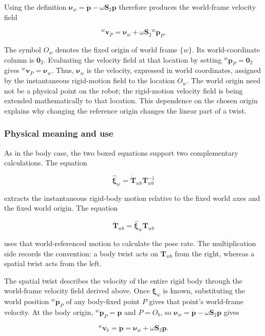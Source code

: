 \documentclass[
  australian,
  12pt,
  letterpaper,
  DIV=11,
  numbers=noendperiod,
  twoside]{scrreprt}
\begin{document}
Using the definition
\(\boldsymbol\nu_w=\dot{\mathbf p}-\omega\mathbf S_2\mathbf p\)
therefore produces the world-frame velocity field

\[
\boxed{
{}^w\mathbf v_P
=
\boldsymbol\nu_w
+
\omega\mathbf S_2{}^w\mathbf p_P
}.
\]

The symbol \(O_w\) denotes the fixed origin of world frame \(\{w\}\).
Its world-coordinate column is \(\mathbf 0_2\). Evaluating the velocity
field at that location by setting \({}^w\mathbf p_P=\mathbf 0_2\) gives
\({}^w\mathbf v_P=\boldsymbol\nu_w\). Thus, \(\boldsymbol\nu_w\) is the
velocity, expressed in world coordinates, assigned by the instantaneous
rigid-motion field to the location \(O_w\). The world origin need not be
a physical point on the robot; the rigid-motion velocity field is being
extended mathematically to that location. This dependence on the chosen
origin explains why changing the reference origin changes the linear
part of a twist.

\subsubsection{Physical meaning and
use}\label{physical-meaning-and-use-1}

As in the body case, the two boxed equations support two complementary
calculations. The equation

\[
\widehat{\boldsymbol\xi}_w
=
\dot{\mathbf T}_{wb}\mathbf T_{wb}^{-1}
\]

extracts the instantaneous rigid-body motion relative to the fixed world
axes and the fixed world origin. The equation

\[
\dot{\mathbf T}_{wb}
=
\widehat{\boldsymbol\xi}_w\mathbf T_{wb}
\]

uses that world-referenced motion to calculate the pose rate. The
multiplication side records the convention: a body twist acts on
\(\mathbf T_{wb}\) from the right, whereas a spatial twist acts from the
left.

The spatial twist describes the velocity of the entire rigid body
through the world-frame velocity field derived above. Once
\(\boldsymbol\xi_w\) is known, substituting the world position
\({}^w\mathbf p_P\) of any body-fixed point \(P\) gives that point's
world-frame velocity. At the body origin, \({}^w\mathbf p_P=\mathbf p\)
and \(P=O_{b}\), so
\(\boldsymbol\nu_w=\dot{\mathbf p}-\omega\mathbf S_2\mathbf p\) gives

\[
\boxed{
{}^w\mathbf v_b
=
\dot{\mathbf p}
=
\boldsymbol\nu_w
+
\omega\mathbf S_2\mathbf p
}.
\]
\end{document}
